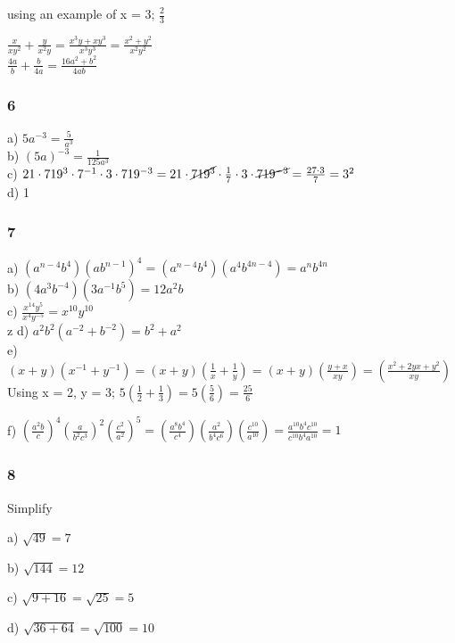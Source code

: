 \documentclass[]{report}
\begin{document}
using an example of x = 3;
$\frac{2}{3} $ 



$\frac{x}{xy^2} + \frac{y}{x^2y} = \frac{x^3y + xy^3}{x^3y^3} = \frac{x^2 + y^2}{x^2y^2}$ \\
$\frac{4a}{b} + \frac{b}{4a} = \frac{16a^2 + b^2}{4ab}$

\subsubsection{6}

a) $5a^{-3}  =  \frac{5}{a^3}$ \\
b) $(5a)^{-3} = \frac{1}{125a^3}$ \\
c) $21 \cdot 719^3 \cdot 7^{-1} \cdot 3 \cdot 719^{-3} = 21 \cdot \cancel{719^3} \cdot \frac{1}{7} \cdot 3 \cdot \cancel{719^{-3}}  = \frac{27 \cdot 3}{7} = 3^2$ \\
d) 1 \\

\subsubsection{7}
a)  $(a^{n-4}b^4)(ab^{n-1})^4 = (a^{n-4}b^4)(a^4b^{4n -4}) = a^nb^{4n}$ \\
b)  $(4a^3b^{-4})(3a^{-1}b^5) = 12a^2b$ \\
c)  $\frac{x^{14}y^5}{x^4y^{-5}} = x^{10}y^{10}$ \\z
d)  $a^2b^2(a^{-2} + b^{-2}) = b^2 + a^2$ \\
e)  $(x+y)(x^{-1} + y^{-1}) =  (x+y)(\frac{1}{x}+\frac{1}{y}) = (x+y)(\frac{y + x}{xy}) = (\frac{x^2 + 2yx + y^2}{xy})$ \\

Using x = 2, y = 3;
$5 (\frac{1}{2}+\frac{1}{3}) = 5 (\frac{5}{6}) = \frac{25}{6}$

f)  $(\frac{a^2b}{c})^4(\frac{a}{b^2c^3})^2(\frac{c^2}{a^2})^5 = (\frac{a^8b^4}{c^4})(\frac{a^2}{b^4c^6})(\frac{c^{10}}{a^{10}}) = \frac{a^{10}b^4c^{10}}{c^{10}b^4a^{10}} = 1$ \\


\subsubsection{8}
Simplify


a) $\sqrt{49} = 7$


b) $\sqrt{144} = 12$

c) $\sqrt{9  + 16} = \sqrt{25} = 5$

d) $\sqrt{36+ 64} = \sqrt{100} = 10$
\end{document}

